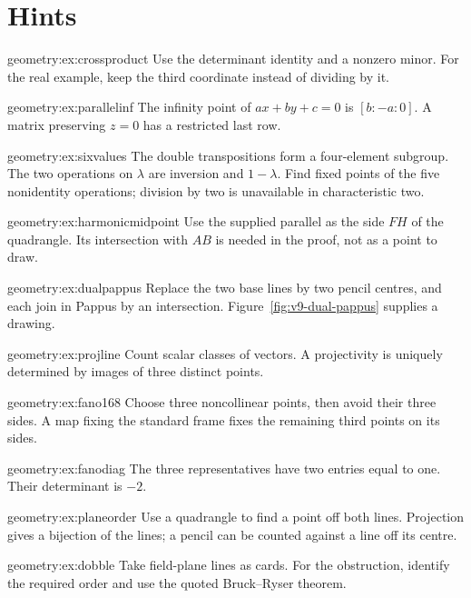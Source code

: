 \section{Hints}

\begin{hint}{geometry:ex:crossproduct}
Use the determinant identity and a nonzero minor. For the real example, keep the third coordinate instead of dividing by it.
\end{hint}
\begin{hint}{geometry:ex:parallelinf}
The infinity point of $ax+by+c=0$ is $[b:-a:0]$. A matrix preserving $z=0$ has a restricted last row.
\end{hint}
\begin{hint}{geometry:ex:sixvalues}
The double transpositions form a four-element subgroup. The two operations on $\lambda$ are inversion and $1-\lambda$. Find fixed points of the five nonidentity operations; division by two is unavailable in characteristic two.
\end{hint}
\begin{hint}{geometry:ex:harmonicmidpoint}
Use the supplied parallel as the side $FH$ of the quadrangle. Its intersection with $AB$ is needed in the proof, not as a point to draw.
\end{hint}
\begin{hint}{geometry:ex:dualpappus}
Replace the two base lines by two pencil centres, and each join in Pappus by an intersection. Figure~\ref{fig:v9-dual-pappus} supplies a drawing.
\end{hint}
\begin{hint}{geometry:ex:projline}
Count scalar classes of vectors. A projectivity is uniquely determined by images of three distinct points.
\end{hint}
\begin{hint}{geometry:ex:fano168}
Choose three noncollinear points, then avoid their three sides. A map fixing the standard frame fixes the remaining third points on its sides.
\end{hint}
\begin{hint}{geometry:ex:fanodiag}
The three representatives have two entries equal to one. Their determinant is $-2$.
\end{hint}
\begin{hint}{geometry:ex:planeorder}
Use a quadrangle to find a point off both lines. Projection gives a bijection of the lines; a pencil can be counted against a line off its centre.
\end{hint}
\begin{hint}{geometry:ex:dobble}
Take field-plane lines as cards. For the obstruction, identify the required order and use the quoted Bruck--Ryser theorem.
\end{hint}
